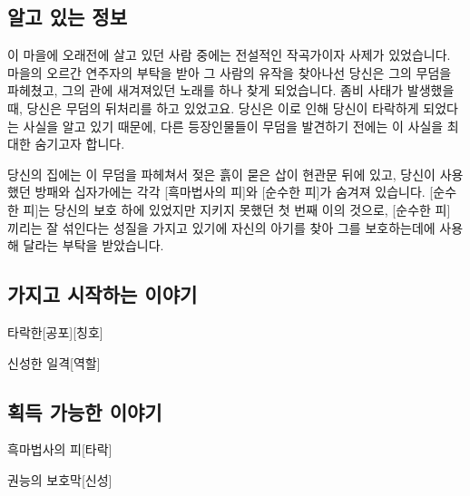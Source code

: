 \documentclass{report}
\begin{document}
	\subsection*{알고 있는 정보}
		이 마을에 오래전에 살고 있던 사람 중에는 전설적인 작곡가이자 사제가 있었습니다. 마을의 오르간 연주자의 부탁을 받아 그 사람의 유작을 찾아나선 당신은 그의 무덤을 파헤쳤고, 그의 관에 새겨져있던 노래를 하나 찾게 되었습니다. 좀비 사태가 발생했을 때, 당신은 무덤의 뒤처리를 하고 있었고요. 당신은 이로 인해 당신이 타락하게 되었다는 사실을 알고 있기 때문에, 다른 등장인물들이 무덤을 발견하기 전에는 이 사실을 최대한 숨기고자 합니다.
		
		당신의 집에는 이 무덤을 파헤쳐서 젖은 흙이 묻은 삽이 현관문 뒤에 있고, 당신이 사용했던 방패와 십자가에는 각각 [흑마법사의 피]와 [순수한 피]가 숨겨져 있습니다. [순수한 피]는 당신의 보호 하에 있었지만 지키지 못했던 첫 번째 이의 것으로, [순수한 피] 끼리는 잘 섞인다는 성질을 가지고 있기에 자신의 아기를 찾아 그를 보호하는데에 사용해 달라는 부탁을 받았습니다.
	
	\subsection*{가지고 시작하는 이야기}
		\begin{spoiler}{타락한}{[공포][칭호]}
			
		\end{spoiler}
		
		\begin{spoiler}{신성한 일격}{[역할]}
		\end{spoiler}
	
	\subsection*{획득 가능한 이야기}
		\begin{spoiler}{흑마법사의 피}{[타락]}
		\end{spoiler}
		
		\begin{spoiler}{권능의 보호막}{[신성]}
			
		\end{spoiler}
\end{document}
